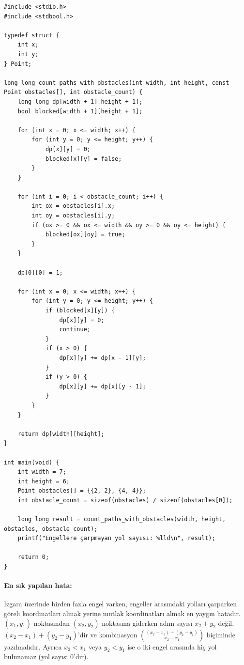 \begin{lstlisting}[language=CTemel]
#include <stdio.h>
#include <stdbool.h>

typedef struct {
    int x;
    int y;
} Point;

long long count_paths_with_obstacles(int width, int height, const Point obstacles[], int obstacle_count) {
    long long dp[width + 1][height + 1];
    bool blocked[width + 1][height + 1];

    for (int x = 0; x <= width; x++) {
        for (int y = 0; y <= height; y++) {
            dp[x][y] = 0;
            blocked[x][y] = false;
        }
    }

    for (int i = 0; i < obstacle_count; i++) {
        int ox = obstacles[i].x;
        int oy = obstacles[i].y;
        if (ox >= 0 && ox <= width && oy >= 0 && oy <= height) {
            blocked[ox][oy] = true;
        }
    }

    dp[0][0] = 1;

    for (int x = 0; x <= width; x++) {
        for (int y = 0; y <= height; y++) {
            if (blocked[x][y]) {
                dp[x][y] = 0;
                continue;
            }
            if (x > 0) {
                dp[x][y] += dp[x - 1][y];
            }
            if (y > 0) {
                dp[x][y] += dp[x][y - 1];
            }
        }
    }

    return dp[width][height];
}

int main(void) {
    int width = 7;
    int height = 6;
    Point obstacles[] = {{2, 2}, {4, 4}};
    int obstacle_count = sizeof(obstacles) / sizeof(obstacles[0]);

    long long result = count_paths_with_obstacles(width, height, obstacles, obstacle_count);
    printf("Engellere çarpmayan yol sayısı: %lld\n", result);

    return 0;
}\end{lstlisting}

\paragraph{En sık yapılan hata:}
Izgara üzerinde birden fazla engel varken, engeller arasındaki yolları çarparken göreli koordinatları almak yerine mutlak koordinatları almak en yaygın hatadır. $(x_1, y_1)$ noktasından $(x_2, y_2)$ noktasına giderken adım sayısı $x_2 + y_2$ değil, $(x_2 - x_1) + (y_2 - y_1)$'dir ve kombinasyon $\binom{(x_2 - x_1) + (y_2 - y_1)}{x_2 - x_1}$ biçiminde yazılmalıdır. Ayrıca $x_2 < x_1$ veya $y_2 < y_1$ ise o iki engel arasında hiç yol bulunamaz (yol sayısı 0'dır).
